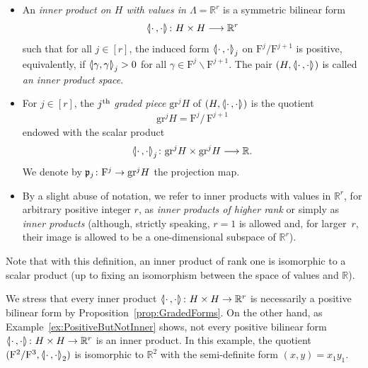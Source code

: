 \documentclass[AHL,Unicode,longabstracts]{cedram}
\newcommand{\llangle}{\mathopen{\langle\mkern -3.1mu\lvert}}
\newcommand{\rrangle}{\mathclose{\rvert\mkern -3.1mu\rangle}}
\newcommand{\highinn}[2]{{\llangle#2\rrangle_{#1}}}
\newcommand{\rquot}[2]{#1/\,#2}
\newcommand{\filter}{\mathrm{F}}
\newcommand{\R}{\mathbb{R}}
\newcommand{\grm}[2]{\mathrm{gr}_{#1}^{#2}}
\newcommand{\proj}{\mathfrak{p}}
\renewcommand{\setminus}{\smallsetminus}
\renewcommand*{\to}{\mathchoice{\longrightarrow}{\rightarrow}{\rightarrow}{\rightarrow}}
\begin{document}
\begin{defi} \label{defi:InnerProduct}\leavevmode
\begin{itemize}
\item An \emph{inner product on $H$ with values in $\Lambda = \R^r$} is a symmetric bilinear form
\[
\highinn{}{\cdot\,, \cdot} \colon H \times H \to \R^r
\]
such that for all $j \in [r]$, the induced form $\highinn{j}{\cdot\,, \cdot}$ on $\filter^j / \filter^{j+1}$ is positive, equivalently, if $\highinn{j}{\gamma, \gamma} >0$ for all $\gamma \in \filter^j \setminus \filter^{j+1}$. The pair $(H, \highinn{}{\cdot\,, \cdot})$ is called \emph{an inner product space}.

\item For $j \in [r]$, the $j^{\rm th}$ \emph{graded piece} $\grm{}{j}H$ of $(H, \highinn{}{\cdot\,, \cdot})$ is the quotient
\[
\grm{}{j}H = \rquot{\filter^j}{\filter^{j+1}}
\]
endowed with the scalar product
\[
\highinn{j}{\cdot\,, \cdot} \colon \grm{}{j}H\times \grm{}{j}H \to \R.
\]
We denote by $\proj_j \colon \filter^j \to \grm{}{j}H$ the projection map.

\item By a slight abuse of notation, we refer to inner products with values in $\R^r$, for arbitrary positive integer $r$, as \emph{inner products of higher rank} or simply as \emph{inner products} (although, strictly speaking, $r=1$ is allowed and, for larger~$r$, their image is allowed to be a one-dimensional subspace of $\R^r$).%
\end{itemize}
\end{defi}



\begin{rema}
Note that with this definition, an inner product of rank one is isomorphic to a scalar product (up to fixing an isomorphism between the space of values and $\R$).%
\end{rema}

\begin{rema}
We stress that every inner product $\highinn{}{\cdot \,, \cdot} \colon H \times H \to \R^r$ is necessarily a positive bilinear form by Proposition~\ref{prop:GradedForms}. On the other hand, as Example~\ref{ex:PositiveButNotInner} shows, not every positive bilinear form $\highinn{}{\cdot \,, \cdot} \colon H \times H \to \R^r$ is an inner product. In this example, the quotient $(\filter^2/\filter^3, \highinn{2}{\cdot \,, \cdot})$ is isomorphic to $\R^2$ with the semi-definite form $(x,y) = x_1y_1$.%
\end{rema}
\end{document}
